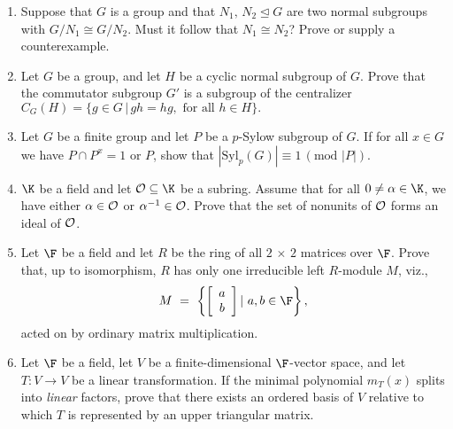 \documentclass[12pt]{article}
\begin{document}
\begin{enumerate}

\item Suppose that $G$ is a group and that $N_1,\, N_2\trianglelefteq G$ are
two normal subgroups with $G/N_1\cong G/N_2$. Must it follow that 
$N_1\cong N_2$? Prove or supply a counterexample.

\item Let $G$ be a group, and let $H$ be a cyclic normal subgroup of $G$. Prove
that the commutator subgroup $G'$ is a subgroup of the centralizer
$C_G(H)=\{g\in G\,|\, gh=hg, \mbox{ for all }h\in H\}.$


\item Let $G$ be a finite group and let $P$ be a $p$-Sylow subgroup
of $G$. If for all $x\in G$ we have $P\cap P^x=1$ or $P$, show that
$|\mbox{Syl}_p(G)|\equiv 1\, (\mbox{mod }|P|)$.


\item $\K$ be a field and let ${\cal O}\subseteq\K$ be
a subring. Assume
that for all $0\not=\alpha\in\K$, we have either $\alpha\in {\cal O}$ or
$\alpha^{-1}\in{\cal O}$. Prove that the set of nonunits of ${\cal O}$
forms an ideal of ${\cal O}$.

\item Let $\F$ be a field and let $R$ be the ring of all $2\, \times\, 2$
matrices over $\F$. Prove that, up to isomorphism, $R$ has only one
irreducible left $R$-module $M$, viz., 
$$M\ =\ \left\lbrace\left[ \begin{array}{c}
                 a \\
                 b
                 \end{array}\right]\vert\ a,b\in {\F}\right\rbrace,$$
acted on by ordinary matrix multiplication.

\item Let $\F$ be a field, let $V$ be a finite-dimensional $\F$-vector space,
and let $T:V\to V$ be a linear transformation. If the minimal polynomial
$m_T(x)$ splits into {\em linear} factors, prove that there exists an
ordered basis of $V$ relative to which $T$ is represented by an upper
triangular matrix.



\end{enumerate}
\end{document}
